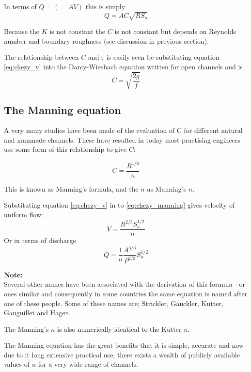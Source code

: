 \documentclass[a4paper, 12pt, british]{article} %
\numberwithin{equation}{section}
\numberwithin{figure}{section}
\numberwithin{table}{section}
\begin{document}
In terms of $Q = (=AV)$ this is simply
\begin{equation}
Q = AC\sqrt{R S_o}
\label{eq:chezy_q}
\end{equation}

Because the $K$ is not constant the $C$ is not constant but depends on Reynolds number and boundary roughness (see discussion in previous section).

The relationship between $C$ and $\tau$ is easily seen be substituting equation \ref{eq:chezy_v} into the Darcy-Wiesbach equation written for open channels and is
\begin{equation}
C = \sqrt{\frac{2 g}{f}}
\end{equation} 
\subsection{The Manning equation}
A very many studies have been made of the evaluation of C for different natural and manmade channels. These have resulted in today most practising engineers use some form of this relationship to give $C$:

\begin{equation}
C = \frac{R^{1/6}}{n}
\label{eq:chezy_manning}
\end{equation}  

This is known as Manning's formula, and the $n$ as Manning's $n$.

Substituting equation \ref{eq:chezy_v} in to \ref{eq:chezy_manning} gives velocity of uniform flow:
\begin{equation}
V = \frac{R^{2/3}S_o^{1/2}}{n}
\label{eq:manning_v}
\end{equation} 
Or in terms of discharge
\begin{equation}
Q = \frac{1}{n}\frac{A^{5/3}}{P^{2/3}}S_o^{1/2}
\label{eq:manning_q} %
\end{equation} 


\textbf{Note:} \\
Several other names have been associated with the derivation of this formula - or ones similar and consequently in some countries the same equation is named after one of these people. Some of these names are; Strickler, Gauckler, Kutter, Gauguillet and Hagen.

The Manning's $n$ is also numerically identical to the Kutter $n$.

The Manning equation has the great benefits that it is simple, accurate and now due to it long extensive practical use, there exists a wealth of publicly available values of $n$ for a very wide range of channels.
\end{document}
